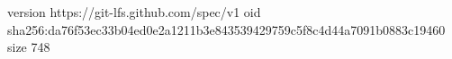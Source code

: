 version https://git-lfs.github.com/spec/v1
oid sha256:da76f53ec33b04ed0e2a1211b3e843539429759c5f8c4d44a7091b0883c19460
size 748
